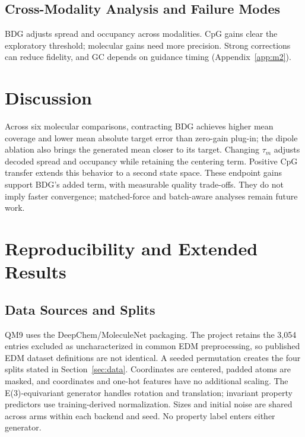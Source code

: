 \documentclass{article}
\begin{document}
\subsection{Cross-Modality Analysis and Failure Modes}\label{sec:failure}
BDG adjusts spread and occupancy across modalities. CpG gains clear the exploratory threshold; molecular gains need more precision. Strong corrections can reduce fidelity, and GC depends on guidance timing (Appendix~\ref{app:m2}).

\section{Discussion}
Across six molecular comparisons, contracting BDG achieves higher mean coverage and lower mean absolute target error than zero-gain plug-in; the dipole ablation also brings the generated mean closer to its target. Changing $\tau_m$ adjusts decoded spread and occupancy while retaining the centering term. Positive CpG transfer extends this behavior to a second state space. These endpoint gains support BDG's added term, with measurable quality trade-offs. They do not imply faster convergence; matched-force and batch-aware analyses remain future work.
\clearpage


\clearpage
\appendix
\renewcommand{\thetable}{S\arabic{table}}
\renewcommand{\theHtable}{S\arabic{table}}
\setcounter{table}{0}
\renewcommand{\thefigure}{S\arabic{figure}}
\renewcommand{\theHfigure}{S\arabic{figure}}
\setcounter{figure}{0}
\section{Reproducibility and Extended Results}
\subsection{Data Sources and Splits}\label{app:data}
QM9 uses the DeepChem/MoleculeNet packaging. The project retains the 3,054 entries excluded as uncharacterized in common EDM preprocessing, so published EDM dataset definitions are not identical. A seeded permutation creates the four splits stated in Section~\ref{sec:data}. Coordinates are centered, padded atoms are masked, and coordinates and one-hot features have no additional scaling. The E(3)-equivariant generator handles rotation and translation; invariant property predictors use training-derived normalization. Sizes and initial noise are shared across arms within each backend and seed. No property label enters either generator.
\end{document}
